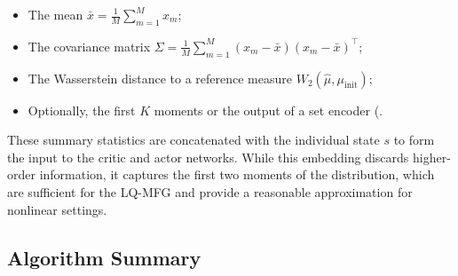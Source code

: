 \begin{itemize}
    \item The mean $\bar{x} = \frac{1}{M}\sum_{m=1}^M x_m$;
    \item The covariance matrix $\Sigma = \frac{1}{M}\sum_{m=1}^M (x_m - \bar{x})(x_m
    - \bar{x})^\top$;
    \item The Wasserstein distance to a reference measure $W_2(\hat\mu,
    \mu_{\mathrm{init}})$;
    \item Optionally, the first $K$ moments or the output of a set encoder (\citep{zaheeretal2017}.
\end{itemize}

These summary statistics are concatenated with the individual state $s$ to form the
input to the critic and actor networks. While this embedding discards higher-order
information, it captures the first two moments of the distribution, which are
sufficient for the LQ-MFG and provide a reasonable approximation for nonlinear
settings.

\subsection{Algorithm Summary}

